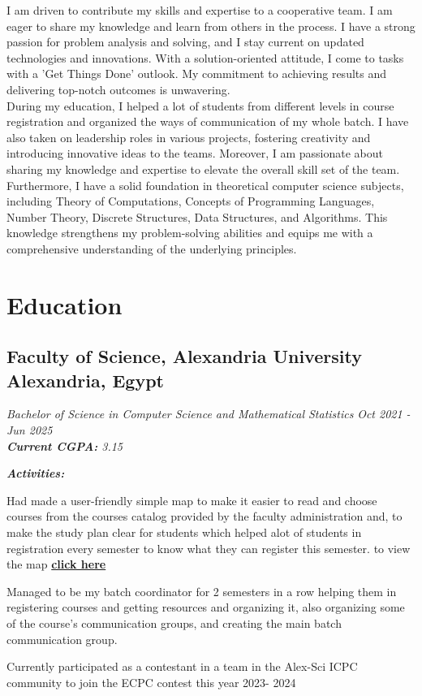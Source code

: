 \documentclass[a4paper,12pt]{article}
\begin{document}
	
 		I am driven to contribute my skills and expertise to a cooperative team. I am eager to share my knowledge and learn from others in the process.  I have a strong passion for problem analysis and solving, and I stay current on updated technologies and innovations. With a solution-oriented attitude, I come to tasks with a 'Get Things Done' outlook. My commitment to achieving results and delivering top-notch outcomes is unwavering.\\

			
		During my education, I helped a lot of students from different levels in course registration and organized the ways of communication of my whole batch. I have also taken on leadership roles in various projects, fostering creativity and introducing innovative ideas to the teams. Moreover, I am passionate about sharing my knowledge and expertise to elevate the overall skill set of the team. Furthermore, I have a solid foundation in theoretical computer science subjects, including Theory of Computations, Concepts of Programming Languages, Number Theory, Discrete Structures, Data Structures, and Algorithms. This knowledge strengthens my problem-solving abilities and equips me with a comprehensive understanding of the underlying principles.


	\section{Education}
		\subsection{Faculty of Science, Alexandria University \hfill \small{Alexandria, Egypt}}
			\vspace{-3mm}
			\textit{Bachelor of Science in Computer Science and Mathematical Statistics} \hfill \small\textit{Oct 2021 - Jun 2025}\\
			
			\textit{\textbf{Current CGPA: } 3.15}

			\textit{\textbf{Activities:}}
			\begin{itemize}
					 \small{\item Had made a user-friendly simple map to make it easier to read and choose courses from the courses catalog provided by the faculty administration and, to make the study plan clear for students which helped alot of students in registration every semester to know what they can register this semester.
						\scriptsize{to view the map \href{https://drive.google.com/file/d/1Z6P57HZftHR9ng1x2sYMtcG8yeUXJsrg/view?usp=sharing}{\textbf{click here}}}}
						
					 \small{\item Managed to be my batch coordinator for 2 semesters in a row helping them in registering courses and getting resources and organizing it, also organizing some of the course's communication groups, and creating the main batch communication group.}
						\item{Currently participated as a contestant in a team in the Alex-Sci ICPC community to join the ECPC contest this year 2023- 2024}
			\end{itemize}
\end{document}
